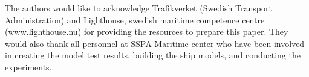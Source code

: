 The authors would like to acknowledge Trafikverket (Swedish Transport Administration) and Lighthouse, swedish maritime competence centre (www.lighthouse.nu) for providing the resources to prepare this paper. They
would also thank all personnel at SSPA Maritime center who have been involved in creating the model test results, building the ship models, and conducting the experiments.
